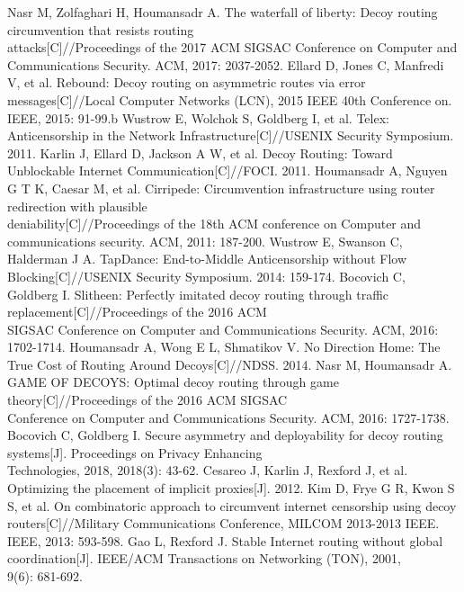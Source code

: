 \documentclass[conference]{IEEEtran}
\begin{document}
\begin{thebibliography}{00}
 Nasr M, Zolfaghari H, Houmansadr A. The waterfall of liberty: Decoy routing circumvention that resists routing\\ attacks[C]//Proceedings of the 2017 ACM SIGSAC Conference on Computer and Communications Security. ACM, 2017: 2037-2052.
 Ellard D, Jones C, Manfredi V, et al. Rebound: Decoy routing on asymmetric routes via error messages[C]//Local Computer Networks (LCN), 2015 IEEE 40th Conference on. IEEE, 2015: 91-99.b
 Wustrow E, Wolchok S, Goldberg I, et al. Telex: Anticensorship in the Network Infrastructure[C]//USENIX Security Symposium. 2011.
 Karlin J, Ellard D, Jackson A W, et al. Decoy Routing: Toward Unblockable Internet Communication[C]//FOCI. 2011.
 Houmansadr A, Nguyen G T K, Caesar M, et al. Cirripede: Circumvention infrastructure using router redirection with plausible\\ deniability[C]//Proceedings of the 18th ACM conference on Computer and communications security. ACM, 2011: 187-200.
 Wustrow E, Swanson C, Halderman J A. TapDance: End-to-Middle Anticensorship without Flow Blocking[C]//USENIX Security Symposium. 2014: 159-174.
 Bocovich C, Goldberg I. Slitheen: Perfectly imitated decoy routing through traffic replacement[C]//Proceedings of the 2016 ACM\\ SIGSAC Conference on Computer and Communications Security. ACM, 2016: 1702-1714.
 Houmansadr A, Wong E L, Shmatikov V. No Direction Home: The True Cost of Routing Around Decoys[C]//NDSS. 2014.
 Nasr M, Houmansadr A. GAME OF DECOYS: Optimal decoy routing through game theory[C]//Proceedings of the 2016 ACM SIGSAC\\ Conference on Computer and Communications Security. ACM, 2016: 1727-1738.
 Bocovich C, Goldberg I. Secure asymmetry and deployability for decoy routing systems[J]. Proceedings on Privacy Enhancing\\ Technologies, 2018, 2018(3): 43-62.
 Cesareo J, Karlin J, Rexford J, et al. Optimizing the placement of implicit proxies[J]. 2012.
 Kim D, Frye G R, Kwon S S, et al. On combinatoric approach to circumvent internet censorship using decoy\\ routers[C]//Military Communications Conference, MILCOM 2013-2013 IEEE. IEEE, 2013: 593-598.
 Gao L, Rexford J. Stable Internet routing without global coordination[J]. IEEE/ACM Transactions on Networking (TON), 2001,\\ 9(6): 681-692.

\end{thebibliography}
\end{document}
